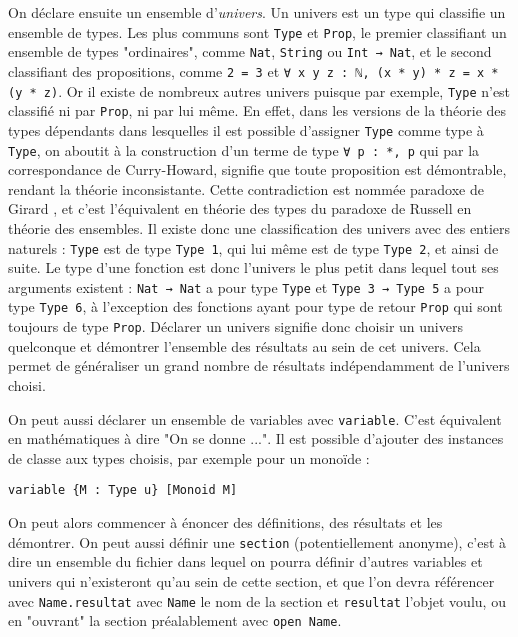 \documentclass[a4paper, 12pt]{article}
\newcommand{\lean}[1]{\texttt{#1}}
\begin{document}
On déclare ensuite un ensemble d'\textit{univers}. Un univers est un type qui classifie un ensemble de types. Les plus communs sont \lean{Type} et \lean{Prop}, le premier classifiant un ensemble de types "ordinaires", comme \lean{Nat}, \lean{String} ou \lean{Int → Nat}, et le second classifiant des propositions, comme \lean{2 = 3} et \lean{∀ x y z : ℕ, (x * y) * z = x * (y * z)}. Or il existe de nombreux autres univers puisque par exemple, \lean{Type} n'est classifié ni par \lean{Prop}, ni par lui même. En effet, dans les versions de la théorie des types dépendants dans lesquelles il est possible d'assigner \lean{Type} comme type à \lean{Type}, on aboutit à la construction d'un terme de type \lean{∀ p : *, p} qui par la correspondance de Curry-Howard, signifie que toute proposition est démontrable, rendant la théorie inconsistante. Cette contradiction est nommée paradoxe de Girard \cite{coquand}, et c'est l'équivalent en théorie des types du paradoxe de Russell en théorie des ensembles. Il existe donc une classification des univers avec des entiers naturels : \lean{Type} est de type \lean{Type 1}, qui lui même est de type \lean{Type 2}, et ainsi de suite. Le type d'une fonction est donc l'univers le plus petit dans lequel tout ses arguments existent : \lean{Nat → Nat} a pour type \lean{Type} et \lean{Type 3 → Type 5} a pour type \lean{Type 6}, à l'exception des fonctions ayant pour type de retour \lean{Prop} qui sont toujours de type \lean{Prop}. Déclarer un univers signifie donc choisir un univers quelconque et démontrer l'ensemble des résultats au sein de cet univers. Cela permet de généraliser un grand nombre de résultats indépendamment de l'univers choisi.

On peut aussi déclarer un ensemble de variables avec \lean{variable}. C'est équivalent en mathématiques à dire "On se donne ...". Il est possible d'ajouter des instances de classe aux types choisis, par exemple pour un monoïde :

\begin{verbatim}
variable {M : Type u} [Monoid M]
\end{verbatim}

On peut alors commencer à énoncer des définitions, des résultats et les démontrer. On peut aussi définir une \lean{section} (potentiellement anonyme), c'est à dire un ensemble du fichier dans lequel on pourra définir d'autres variables et univers qui n'existeront qu'au sein de cette section, et que l'on devra référencer avec \lean{Name.resultat} avec \lean{Name} le nom de la section et \lean{resultat} l'objet voulu, ou en "ouvrant" la section préalablement avec \lean{open Name}.
\end{document}
